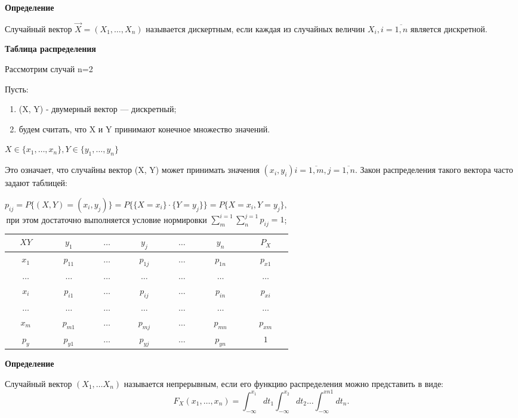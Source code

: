 \textbf{Определение}

Случайный вектор $\overrightarrow{X} = (X_1, \dots, X_n)$ называется дискертным, если каждая из случайных величин $X_i, i=\overline{1,n}$ является дискретной.


\textbf{Таблица распределения}

Рассмотрим случай n=2

Пусть: 
\begin{enumerate}[label=\arabic*.]
	\item (X, Y) - двумерный вектор --- дискретный;
	\item будем считать, что X и Y принимают конечное множество значений.  
\end{enumerate}
$X \in \{x_1, \dots, x_n\}, Y \in \{y_1, \dots, y_n\}$

Это означает, что случайны вектор (X, Y) может принимать значения $(x_i, y_i) i=\overline{1,m}, j=\overline{1,n}$. Закон распределения такого вектора часто задают таблицей:
 
\begin{table}[ht!]
	\begin{center}
		\caption{$p_{ij} = P\{(X, Y)=(x_i, y_j)\} = P\{\{X=x_i\} \cdot \{Y=y_j\}\} = P\{X=x_i, Y=y_j\}, $ при этом достаточно выполняется условие нормировки $\sum_{m}^{i=1}\sum_{n}^{j=1}p_{ij}=1$;}
		\label{tbl:best}
		\begin{tabular}{|c|c|c|c|c|c|c|}
			\hline
			$XY$ & $y_1$ & $\dots$ & $y_j$ & $\dots$ &  $y_n$ & $P_X$\\  \hline
			$x_1$ & $p_{11}$ & $\dots$ & $p_{1j}$ & $\dots$ &  $p_{1n}$ & $p_{x1}$\\  \hline
			$\dots$ & $\dots$ & $\dots$ & $\dots$ & $\dots$ &  $\dots$ & $\dots$\\  \hline
			$x_i$ & $p_{i1}$ & $\dots$ & $p_{ij}$ & $\dots$ &  $p_{in}$ & $p_{xi}$\\  \hline
			$\dots$ & $\dots$ & $\dots$ & $\dots$ & $\dots$ &  $\dots$ & $\dots$\\ \hline
			$x_m$ & $p_{m1}$ & $\dots$ & $p_{mj}$ & $\dots$ &  $p_{mn}$ & $p_{xm}$\\  \hline
			$p_y$ & $p_{y1}$ & $\dots$ & $p_{yj}$ & $\dots$ &  $p_{yn}$ & $1$\\  
			\hline
		\end{tabular}
	\end{center}
\end{table}

\textbf{Определение}

Случайный вектор $(X_1, \dots X_n)$ называется непрерывным, если его функцию распределения можно представить в виде: 
\begin{equation}
	F_X(x_1, \dots, x_n) = \int_{-\infty}^{x_1}dt_1\int_{-\infty}^{x_2}dt_2 \dots
	\int_{-\infty}^{xn1}dt_n.
\end{equation}

